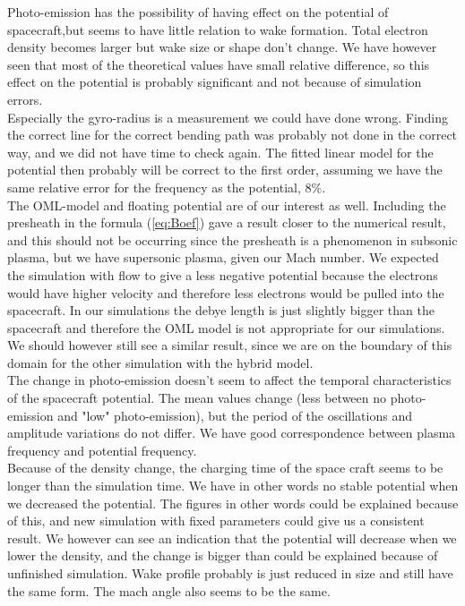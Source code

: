 \documentclass[aip, 
rsi, 
amsmath,
amssymb,
longbibliography,
reprint]{revtex4-1}
\begin{document}
Photo-emission has the possibility of having effect on the potential of spacecraft,but seems to have little relation to wake formation. Total electron density becomes larger but wake size or shape don't change. We have however seen that most of the theoretical values have small relative difference, so this effect on the potential is probably significant and not because of simulation errors.\\

Especially the gyro-radius is a measurement we could have done wrong. Finding the correct line for the correct bending path was probably not done in the correct way, and we did not have time to check again. The fitted linear model for the potential then probably will be correct to the first order, assuming we have the same relative error for the frequency as the potential, $8\%$.\\

The OML-model and floating potential are of our interest as well. Including the presheath in the formula (\ref{eq:Boef}) gave a result closer to the numerical result, and this should not be occurring since the presheath is a phenomenon in subsonic plasma, but we have supersonic plasma, given our Mach number. We expected the simulation with flow to give a less negative potential because the electrons would have higher velocity and therefore less electrons would be pulled into the spacecraft. In our simulations the debye length is just slightly bigger than the spacecraft and therefore the OML model is not appropriate for our simulations. We should however still see a similar result, since we are on the boundary of this domain for the other simulation with the hybrid model\cite{P7}.\\

The change in photo-emission doesn't seem to affect the temporal characteristics of the spacecraft potential. The mean values change (less between no photo-emission and "low" photo-emission), but the period of the oscillations and amplitude variations do not differ. We have good correspondence between plasma frequency and potential frequency.\\

Because of the density change, the charging time of the space craft seems to be longer than the simulation time. We have in other words no stable potential when we decreased the potential. The figures in other words could be explained because of this, and new simulation with fixed parameters could give us a consistent result. We however can see an indication that the potential will decrease when we lower the density, and the change is bigger than could be explained because of unfinished simulation. Wake profile probably is just reduced in size and still have the same form. The mach angle also seems to be the same. 
\end{document}

